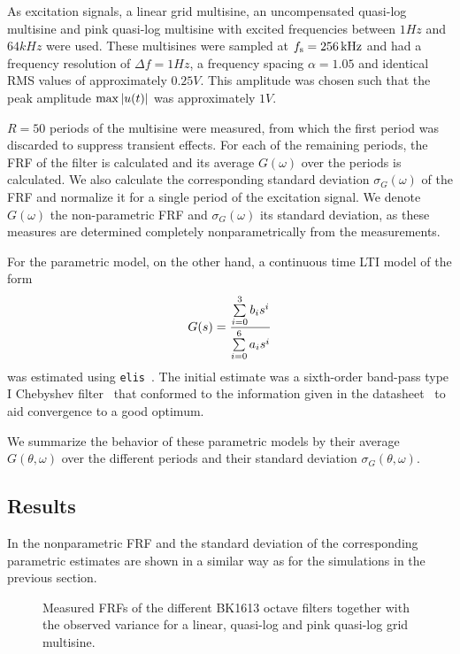     As excitation signals, a linear grid multisine, an uncompensated quasi-log multisine and pink quasi-log multisine with excited frequencies between $1 \unit{Hz}$ and $64 \unit{kHz}$ were used.
    These multisines were sampled at $f_{\mathrm{s}} = 256\,\mathrm{kHz}$ and had a frequency resolution of $\Delta f = 1 \unit{Hz}$, a frequency spacing $\alpha = 1.05$ and identical \gls{RMS} values of approximately $0.25 \unit{V}$.
    This amplitude was chosen such that the peak amplitude $\max \left| u(t) \right|$ was approximately $1 \unit{V}$.

    $R=50$ periods of the multisine were measured, from which the first period was discarded to suppress transient effects.
    For each of the remaining periods, the \gls{FRF} of the filter is calculated and its average $G\left(\omega \right)$ over the periods is calculated.
    We also calculate the corresponding standard deviation $\sigma_G\left( \omega \right)$ of the \gls{FRF} and normalize it for a single period of the excitation signal.
    We denote $G\left(\omega \right)$ the non-parametric FRF and $\sigma_G\left( \omega \right)$ its standard deviation, as these measures are determined completely nonparametrically from the measurements.

    For the parametric model, on the other hand, a continuous time \gls{LTI} model of the form
    \begin{equation}
      G(s) = \frac{\sum\limits_{i=0}^3 b_i s^i}{\sum\limits_{i=0}^6 a_i s^i}
    \end{equation}
    was estimated using \texttt{elis}~\citep{FDIDENT}.
    The initial estimate was a sixth-order band-pass type I Chebyshev filter~\citep{Zverev1967} that conformed to the information given in the datasheet~\citep{datasheet_bk1613} to aid convergence to a good optimum.

    We summarize the behavior of these parametric models by their average $G\left(\theta,\omega \right)$ over the different periods and their standard deviation $\sigma_G\left(\theta,\omega \right)$.

    \subsection{Results}
    In  the nonparametric \gls{FRF} and the standard deviation of the corresponding parametric estimates are shown in a similar way as for the simulations in the previous section.

    \begin{figure}%
    \centering
      \setlength{}
      \setlength\figureheight{0.68\figurewidth}
    
    \caption[Measured FRFs of all BK1613 octave filters and their variance for different excitation signals.]{Measured FRFs of the different \bruelkjaer BK1613 octave filters together with the observed variance for a linear, quasi-log and pink quasi-log grid multisine.}
      \label{fig:excitation:measurements}
    \end{figure}

